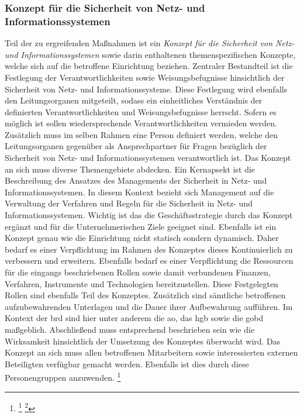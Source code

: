 \documentclass[11pt,a4paper,hidelinks]{article}   %
\begin{document}
            \subsubsection{Konzept für die Sicherheit von Netz- und Informationssystemen}
            Teil der zu ergreifenden Maßnahmen ist ein \emph{Konzept für die Sicherheit von Netz- und Informationssystemen} sowie darin enthaltenen themenspezifischen Konzepte, welche sich auf die betroffene Einrichtung beziehen. Zentraler Bestandteil ist die Festlegung der Verantwortlichkeiten sowie Weisungsbefugnisse hinsichtlich der Sicherheit von Netz- und Informationssysteme. Diese Festlegung wird ebenfalls den Leitungsorganen mitgeteilt, sodass ein einheitliches Verständnis der definierten Verantwortlichkeiten und Weisungsbefugnisse herrscht. Sofern es möglich ist sollen wiedersprechende Verantwortlichkeiten vermieden werden. Zusätzlich muss im selben Rahmen eine Person definiert werden, welche den Leitungsorganen gegenüber als Ansprechpartner für Fragen bezüglich der Sicherheit von Netz- und Informationssystemen verantwortlich ist. Das Konzept an sich muss diverse Themengebiete abdecken. Ein Kernapsekt ist die Beschreibung des Ansatzes des Managements der Sicherheit in Netz- und Informationssystemen. In diesem Kontext bezieht sich Management auf die Verwaltung der Verfahren und Regeln für die Sicherheit in Netz- und Informationssystemen. Wichtig ist das die Geschäftsstrategie durch das Konzept ergänzt und für die Unternehmerischen Ziele geeignet sind. Ebenfalls ist ein Konzept genau wie die Einrichtung nicht statisch sondern dynamisch. Daher bedarf es einer Verpflichtung im Rahmen des Konzeptes dieses Kontinuierlich zu verbessern und erweitern. Ebenfalls bedarf es einer Verpflichtung die Ressourcen für die eingangs beschriebenen Rollen sowie damit verbundenen Finanzen, Verfahren, Instrumente und Technologien bereitzustellen. Diese Festgelegten Rollen sind ebenfalls Teil des Konzeptes. Zusätzlich sind sämtliche betroffenen aufzubewahrenden Unterlagen und die Dauer ihrer Aufbewahrung aufführen. Im Kontext der \gls{brd} sind hier unter anderem die \gls{ao}, das \gls{hgb} sowie die \gls{gobd} maßgeblich. Abschließend muss entsprechend beschrieben sein wie die Wirksamkeit hinsichtlich der Umsetzung des Konzeptes überwacht wird. Das Konzept an sich muss allen betroffenen Mitarbeitern sowie interessierten externen Beteiligten verfügbar gemacht werden. Ebenfalls ist dies durch diese Personengruppen anzuwenden. \footnote{
                \footcite[Vgl. Nummer 1,][, Anhang]{EU2024-2690}
                \footcite[Referenz für Unternehmen die sich Wandeln][]{MISSING}
            }
\end{document}
